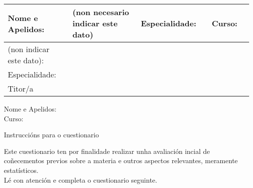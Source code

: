 \documentclass[letterpaper,12pt,notitlepage,spanish]{article}
\begin{document}
%
%
%
\begin{center}
\vspace*{0.5cm}
%
%
%
\begin{flushleft}
\begin{tabular}{| l | l | c | l | l | l |}
\hline
Nome e Apelidos: & \small{(non necesario indicar este dato)} & Especialidade: & \hrulefill & Curso: & \\ \hline 
\small{(non indicar este dato)}: & \\ \hline
Especialidade: &  \\\hline
Titor/a &  \\ \hline
\end{tabular}
\end{flushleft}
%
%

\vspace{1.10cm}
	\begin{flushleft}
	Nome e Apelidos: \hrulefill \\ 
	Curso: \hrulefill\\
	\vspace*{0.50cm}
		\begin{center}
		\small{Instruccións para o cuestionario}\\		
		\end{center}
	\vspace*{0.25cm}
%
\small{ %
Este cuestionario ten por finalidade realizar unha avaliación incial de coñecementos previos sobre a materia e outros aspectos relevantes, meramente estatísticos. \\
Lé con atención e completa o cuestionario seguinte. \\
} %
%
	\vspace*{0.25cm}		
 	\end{flushleft}
\end{center}
%
%
%
%
%
%
%
%
\end{document}
